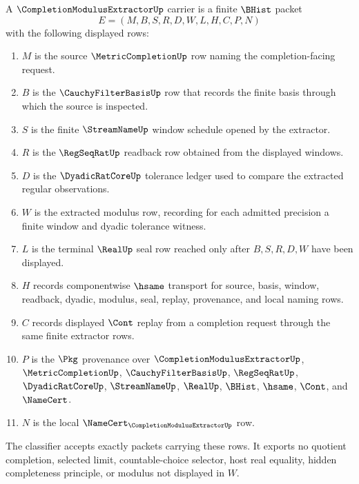 \begin{definition}
\label{def:completion-modulus-extractor-carrier}
A $\CompletionModulusExtractorUp$ carrier is a finite $\BHist$ packet
$$
E=(M,B,S,R,D,W,L,H,C,P,N)
$$
with the following displayed rows:
\begin{enumerate}
\item $M$ is the source $\MetricCompletionUp$ row naming the completion-facing request.
\item $B$ is the $\CauchyFilterBasisUp$ row that records the finite basis through which the source is inspected.
\item $S$ is the finite $\StreamNameUp$ window schedule opened by the extractor.
\item $R$ is the $\RegSeqRatUp$ readback row obtained from the displayed windows.
\item $D$ is the $\DyadicRatCoreUp$ tolerance ledger used to compare the extracted regular observations.
\item $W$ is the extracted modulus row, recording for each admitted precision a finite window and dyadic tolerance witness.
\item $L$ is the terminal $\RealUp$ seal row reached only after $B,S,R,D,W$ have been displayed.
\item $H$ records componentwise $\hsame$ transport for source, basis, window, readback, dyadic, modulus, seal, replay, provenance, and local naming rows.
\item $C$ records displayed $\Cont$ replay from a completion request through the same finite extractor rows.
\item $P$ is the $\Pkg$ provenance over $\CompletionModulusExtractorUp$, $\MetricCompletionUp$, $\CauchyFilterBasisUp$, $\RegSeqRatUp$, $\DyadicRatCoreUp$, $\StreamNameUp$, $\RealUp$, $\BHist$, $\hsame$, $\Cont$, and $\NameCert$.
\item $N$ is the local $\NameCert_{\CompletionModulusExtractorUp}$ row.
\end{enumerate}
The classifier accepts exactly packets carrying these rows. It exports no quotient completion, selected limit, countable-choice selector, host real equality, hidden completeness principle, or modulus not displayed in $W$.
\end{definition}

